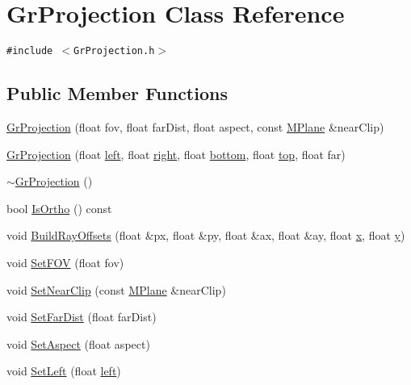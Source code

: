 \hypertarget{class_gr_projection}{
\section{GrProjection Class Reference}
\label{class_gr_projection}
}
{\tt \#include $<$GrProjection.h$>$}

\subsection*{Public Member Functions}
\begin{CompactItemize}
\item 
\hyperlink{class_gr_projection_55d2c10a1c3d7e47ce5b8b6fd69dd411}{GrProjection} (float fov, float farDist, float aspect, const \hyperlink{class_m_plane}{MPlane} \&nearClip)
\item 
\hyperlink{class_gr_projection_27b24c0dfda0a512db290333f1aecb07}{GrProjection} (float \hyperlink{glext_8h_85b8f6c07fbc1fb5d77c2ae090f21995}{left}, float \hyperlink{glext_8h_5ffadbbacc6b89cf6218bc43b384d3fe}{right}, float \hyperlink{glext_8h_95fc257e5ddf46f7db9d5e898cdf1991}{bottom}, float \hyperlink{glext_8h_5ab323daeacf8dfdb8f91132fecdca23}{top}, float far)
\item 
\hyperlink{class_gr_projection_24795b4bdf7379373e7560f25ec7b19b}{$\sim$GrProjection} ()
\item 
bool \hyperlink{class_gr_projection_abd3817acc3eeef6f80ff8e30fc1467c}{IsOrtho} () const 
\item 
void \hyperlink{class_gr_projection_29f014578f35e4a8386abda391966228}{BuildRayOffsets} (float \&px, float \&py, float \&ax, float \&ay, float \hyperlink{wglext_8h_d77deca22f617d3f0e0eb786445689fc}{x}, float \hyperlink{wglext_8h_9298c7ad619074f5285b32c6b72bfdea}{y})
\item 
void \hyperlink{class_gr_projection_f4b558c458d3a59acd574af5d7f84850}{SetFOV} (float fov)
\item 
void \hyperlink{class_gr_projection_a411d73393ffd79ae827bcad8de91090}{SetNearClip} (const \hyperlink{class_m_plane}{MPlane} \&nearClip)
\item 
void \hyperlink{class_gr_projection_3671a2d19ad8e30a24968fbe105563ee}{SetFarDist} (float farDist)
\item 
void \hyperlink{class_gr_projection_ecaec8627848803b87a11bd3638c2664}{SetAspect} (float aspect)
\item 
void \hyperlink{class_gr_projection_142d79699a01bc461466dccfcc3782ae}{SetLeft} (float \hyperlink{glext_8h_85b8f6c07fbc1fb5d77c2ae090f21995}{left})

\end{CompactItemize}
